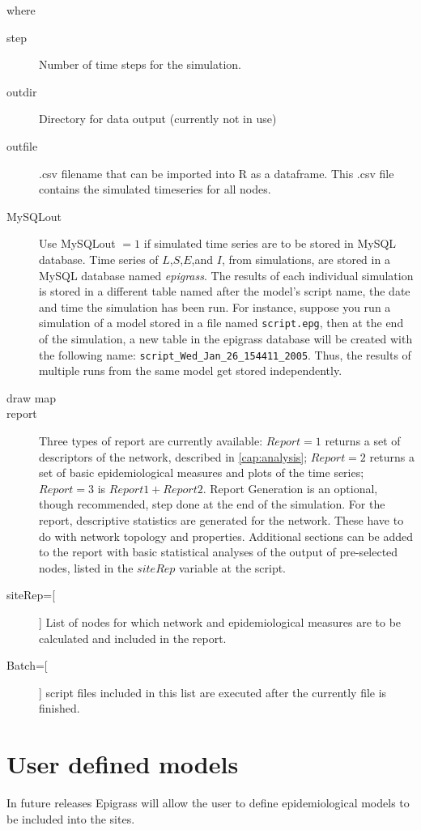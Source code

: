 where
\begin{description}
\item[step] Number of time steps for the simulation.
\item[outdir] Directory for data output (currently not in use)
\item[outfile] .csv filename that can be imported into R as a dataframe. This .csv file contains the simulated timeseries for all nodes.
\item[MySQLout] Use MySQLout $= 1$ if simulated time series are to be stored in MySQL database. Time series of $L$,$S$,$E$,and $I$, from simulations, are stored in a MySQL database named \emph{epigrass}. The results of each individual simulation is stored in a different table named after the model's script name, the date and time the simulation has been run. For instance, suppose you run a simulation of a model stored in a file named \texttt{script.epg}, then at the end of the simulation, a new table in the epigrass database will be created with the following name: \texttt{script\_Wed\_Jan\_26\_154411\_2005}. Thus, the results of multiple runs from the same model get stored independently.
\item[draw map]
\item[report]Three types of report are currently available: $Report = 1$ returns a set of descriptors of the network, described in \ref{cap:analysis}; $Report = 2$ returns a set of basic epidemiological measures and plots of the time series; $Report = 3$ is $Report 1 + Report 2$. Report Generation is an optional, though recommended, step done at the end of the simulation. For the report, descriptive statistics are generated for the network. These have to do with network topology and properties. Additional sections can be added to the report with basic statistical analyses of the output of pre-selected nodes, listed  in the $siteRep$ variable at the script.
\item[siteRep=[]] List of nodes for which network and epidemiological measures are to be calculated and included in the report.
\item[Batch=[]] script files included in this list are executed after the currently file is finished.
\end{description}
\section{User defined models}
In future releases Epigrass will allow the user to define epidemiological models to be included into the sites.


